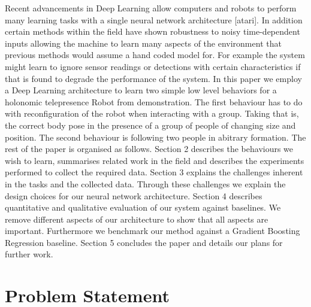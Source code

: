 \documentclass[letterpaper, 10 pt, conference]{ieeeconf}
\begin{document}
 Recent advancements in Deep Learning allow computers and robots to perform many learning tasks with a single neural network architecture [atari]. In addition certain methods within the field have shown robustness to noisy time-dependent inputs allowing the machine to learn many aspects of the environment that previous methods would assume a hand coded model for. For example the system might learn to ignore sensor readings or detections with certain characteristics if that is found to degrade the performance of the system. In this paper we employ a Deep Learning architecture to learn two simple low level behaviors for a holonomic telepresence Robot from demonstration. The first behaviour has to do with reconfiguration of the robot when interacting with a group. Taking that is, the correct body pose in the presence of a group of people of changing size and position. The second behaviour is following two people in abitrary formation. The rest of the paper is organised as follows. Section 2 describes the behaviours we wish to learn, summarises related work in the field and describes the experiments performed to collect the required data. Section 3 explains the challenges inherent in the tasks and the collected data. Through these challenges we explain the design choices for our neural network architecture. Section 4 describes quantitative and qualitative evaluation of our system against baselines. We remove different aspects of our architecture to show that all aspects are important. Furthermore we benchmark our method against a Gradient Boosting Regression baseline. Section 5 concludes the paper and details our plans for further work.




\section{Problem Statement \label{sec:related_work}}
\end{document}
